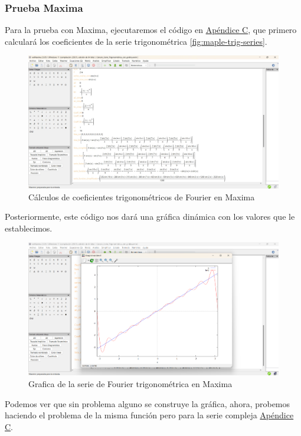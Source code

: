 \subsubsection{Prueba Maxima}
Para la prueba con Maxima, ejecutaremos el código en \hyperref[app3:trig-code-maxima]{Apéndice C}, que primero calculará los coeficientes de la serie trigonométrica \ref{fig:maple-trig-series}. 
\begin{figure}[H]
	\centering
	\includegraphics[width=1\textwidth]{img/chapter02/maxima-trig-series-coeff.jpeg}
	\caption{Cálculos de coeficientes trigonométricos de Fourier en Maxima}
	\label{fig:maxima-trig-series}  %
\end{figure}
Posteriormente, este código nos dará una gráfica dinámica con los valores que le establecimos.
\begin{figure}[H]
	\centering
	\includegraphics[width=1\textwidth]{img/chapter02/maxima-trig-series-graph.png}
	\caption{Grafica de la serie de Fourier trigonométrica en Maxima}
	\label{fig:maxima-trig-series-graph}  %
\end{figure}

Podemos ver que sin problema alguno se construye la gráfica, ahora, probemos haciendo el problema de la misma función pero para la serie compleja  \hyperref[app3:complex-code-maxima]{Apéndice C}. 

